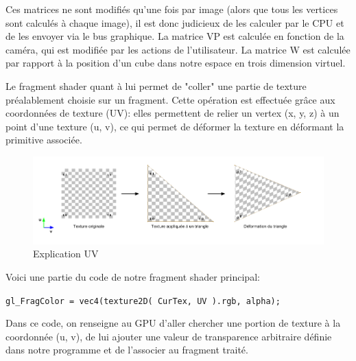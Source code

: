 Ces matrices ne sont modifiés qu'une fois par image (alors que tous les vertices sont calculés à chaque image), il est donc judicieux de les calculer par le CPU et de les envoyer via le bus graphique. La matrice VP est calculée en fonction de la caméra, qui est modifiée par les actions de l'utilisateur. La matrice W est calculée par rapport à la position d'un cube dans notre espace en trois dimension virtuel.

Le fragment shader quant à lui permet de "coller" une partie de texture préalablement choisie sur un fragment. Cette opération est effectuée grâce aux coordonnées de texture (UV): elles permettent de relier un vertex (x, y, z) à un point d'une texture (u, v), ce qui permet de déformer la texture en déformant la primitive associée.

\begin{figure}[h]
 \centering
 \includegraphics[scale=0.4,keepaspectratio=true]{img/uvexpl.png}
 \caption{Explication UV}
 \label{uv}
\end{figure}

Voici une partie du code de notre fragment shader principal:\newline

\verb|gl_FragColor = vec4(texture2D( CurTex, UV ).rgb, alpha);|\newline

Dans ce code, on renseigne au GPU d'aller chercher une portion de texture à la coordonnée (u, v), de lui ajouter une valeur de transparence arbitraire définie dans notre programme et de l'associer au fragment traité.